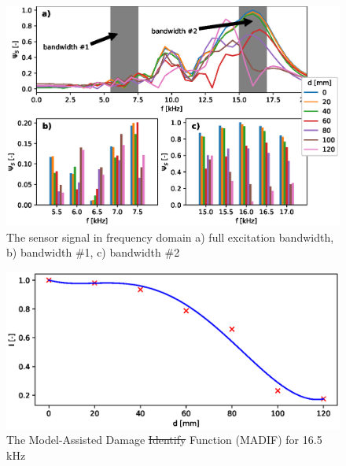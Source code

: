 \documentclass[materials,article,submit,moreauthors,pdftex]{Definitions/mdpi}
\providecommand{\DIFadd}[1]{{\protect\color{blue}{#1}}} %
\providecommand{\DIFdel}[1]{{\protect\color{red}\sout{#1}}}                      %
\providecommand{\DIFdelbegin}{} %
\providecommand{\DIFaddFL}[1]{\DIFadd{#1}} %
\providecommand{\DIFdelFL}[1]{\DIFdel{#1}} %
\providecommand{\DIFaddbeginFL}{} %
\providecommand{\DIFaddendFL}{} %
\providecommand{\DIFdelbeginFL}{} %
\providecommand{\DIFdelendFL}{} %
\begin{document}
\DIFadd{The transmission coefficient of elastic waves decreases locally within the defect area because the acoustic impedance of air is less than that of the adhesive layer.
As a result, the amplitude of the transmitted wave varies depending on the damage size.
}\begin{figure}
	\begin{center}
		\DIFaddendFL \includegraphics[width=1\linewidth]{../../figures/eps/mgntPhiFFT.eps}
	\end{center}
	\caption{The sensor signal in frequency domain a) full excitation bandwidth, b) bandwidth \#1, c) bandwidth \#2}
	\label{fig:signals}
\end{figure}
\DIFdelbegin %
\DIFdelendFL \DIFaddbeginFL \begin{figure}
	\DIFaddendFL \begin{center}
		\includegraphics[width=1\linewidth]{../../figures/eps/madif.eps}
	\end{center}
	\caption{The Model-Assisted Damage \DIFdelbeginFL \DIFdelFL{Identify }\DIFdelendFL \DIFaddbeginFL \DIFaddFL{Identification }\DIFaddendFL Function (MADIF) for 16.5 kHz}
	\label{fig:madif}
\end{figure}
\end{document}
